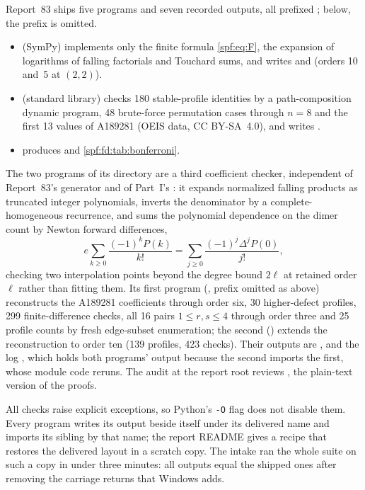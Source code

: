 \documentclass[11pt]{article}
\numberwithin{equation}{section}
\theoremstyle{definition}
\theoremstyle{remark}
\theoremstyle{definition}
\begin{document}
Report~83 ships five programs and seven recorded outputs, all prefixed
; below, the prefix is omitted.
\begin{itemize}
\item {} (SymPy) implements only the finite
 formula \eqref{spf:eq:F}, the expansion of logarithms of falling factorials
 and Touchard sums, and writes  and
  (orders 10 and~5 at $(2,2)$).
\item {} (standard library) checks 180
 stable-profile identities by a path-composition dynamic program, 48
 brute-force permutation cases through $n=8$ and the first 13 values of
 A189281 (OEIS data, CC BY-SA~4.0), and writes
 .
\item {} produces
  and \cref{spf:fd:tab:bonferroni}.
\end{itemize}

The two programs of its  directory are a third
coefficient checker, independent of Report~83's generator and of Part~I's
: it expands normalized falling products as
truncated integer polynomials, inverts the denominator by a
complete-homogeneous recurrence, and sums the polynomial dependence on the
dimer count by Newton forward differences,
\[
 e\sum_{k\ge0}\frac{(-1)^kP(k)}{k!}=\sum_{j\ge0}\frac{(-1)^j\Delta^jP(0)}{j!},
\]
checking two interpolation points beyond the degree bound $2\ell$ at retained
order~$\ell$ rather than fitting them. Its first program
(, prefix omitted as
above) reconstructs the A189281 coefficients through order six, 30
higher-defect profiles, 299 finite-difference checks, all 16 pairs
$1\le r,s\le4$ through order three and 25 profile counts by fresh edge-subset
enumeration; the second () extends the
reconstruction to order ten (139 profiles, 423 checks). Their outputs are
,
 and the log
, which holds both programs' output because the
second imports the first, whose module code reruns. The audit
 at the report root reviews
, the plain-text version of the proofs.

All checks raise explicit exceptions, so Python's \texttt{-O} flag does not
disable them. Every program writes its output beside itself under its
delivered name and imports its sibling by that name; the report README gives
a recipe that restores the delivered layout in a scratch copy. The intake
ran the whole suite on such a copy in under three minutes: all outputs equal
the shipped ones after removing the carriage returns that Windows adds.
\end{document}
